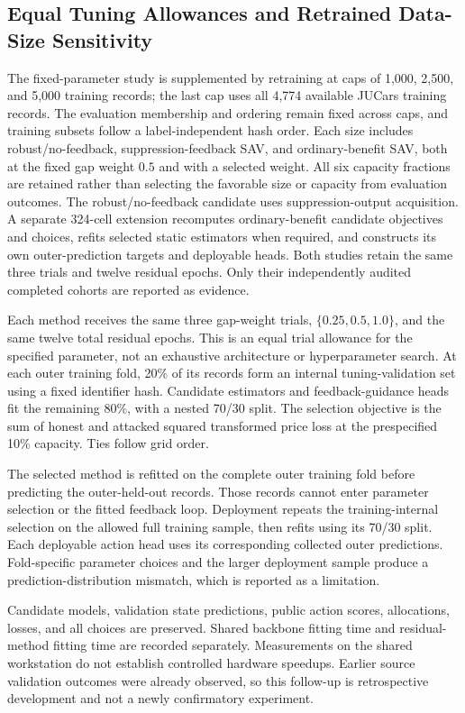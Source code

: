 \subsection{Equal Tuning Allowances and Retrained Data-Size Sensitivity}

The fixed-parameter study is supplemented by retraining at caps of 1,000,
2,500, and 5,000 training records; the last cap uses all 4,774 available JUCars
training records. The evaluation membership and ordering remain fixed across
caps, and training subsets follow a label-independent hash order. Each size
includes robust/no-feedback, suppression-feedback SAV, and ordinary-benefit
SAV, both at the fixed gap weight $0.5$ and with a selected weight. All six
capacity fractions are retained rather than selecting the favorable size or
capacity from evaluation outcomes. The robust/no-feedback candidate uses
suppression-output acquisition. A separate 324-cell extension recomputes
ordinary-benefit candidate objectives and choices, refits selected static
estimators when required, and constructs its own outer-prediction targets and
deployable heads. Both studies retain the same three trials and twelve
residual epochs. Only their independently audited completed cohorts are
reported as evidence.

Each method receives the same three gap-weight trials, $\{0.25,0.5,1.0\}$,
and the same twelve total residual epochs. This is an equal trial allowance
for the specified parameter, not an exhaustive architecture or hyperparameter
search. At each outer training fold, 20\% of its records form an internal
tuning-validation set using a fixed identifier hash. Candidate estimators and
feedback-guidance heads fit the remaining 80\%, with a nested 70/30 split.
The selection objective is the sum of honest and attacked squared transformed
price loss at the prespecified 10\% capacity. Ties follow grid order.

The selected method is refitted on the complete outer training fold before
predicting the outer-held-out records. Those records cannot enter parameter
selection or the fitted feedback loop. Deployment repeats the training-internal
selection on the allowed full training sample, then refits using its 70/30
split. Each deployable action head uses its corresponding collected outer
predictions. Fold-specific parameter choices and the larger deployment sample
produce a prediction-distribution mismatch, which is reported as a limitation.

Candidate models, validation state predictions, public action scores,
allocations, losses, and all choices are preserved. Shared backbone fitting
time and residual-method fitting time are recorded separately. Measurements on
the shared workstation do not establish controlled hardware speedups. Earlier
source validation outcomes were already observed, so this follow-up is
retrospective development and not a newly confirmatory experiment.
